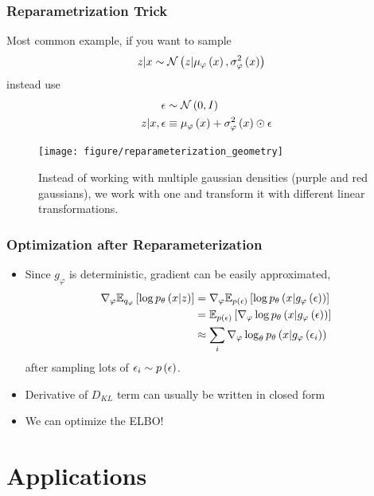 \documentclass[10pt,mathserif]{beamer}
\begin{document}
\begin{frame}
  \frametitle{Reparametrization Trick}
  Most common example, if you want to sample
  \begin{align*}
    z \vert x &\sim \mathcal{N}\left(z \vert \mu_{\varphi}\left(x\right), \sigma_{\varphi}^{2}\left(x\right)\right)
  \end{align*}
  instead use
  \begin{align*}
    \epsilon &\sim \mathcal{N}\left(0, I\right) \\
    z \vert x, \epsilon &\equiv \mu_{\varphi}\left(x\right) + \sigma_{\varphi}^{2}\left(x\right) \odot \epsilon
  \end{align*}
\begin{figure}[ht]
  \centering
  \texttt{[image: figure/reparameterization\_geometry]}
  \caption{Instead of working with multiple gaussian densities (purple and red
    gaussians), we work with one and transform it with different linear
    transformations. \label{fig:reparameterization_geometry} }
\end{figure}

\end{frame}

\begin{frame}
  \frametitle{Optimization after Reparameterization}
  \begin{itemize}
  \item Since $g_{\varphi}$ is deterministic, gradient can be easily
    approximated,
  \begin{align*}
    \nabla_{\varphi} \mathbb{E}_{q_{\varphi}}\left[{\log p_{\theta}\left(x \vert z\right)}\right] &=
    \nabla_{\varphi} \mathbb{E}_{p\left(\epsilon\right)}\left[{\log p_{\theta}\left(x \vert g_{\varphi}\left(\epsilon\right)\right)}\right] \\
    &= \mathbb{E}_{p\left(\epsilon\right)}\left[{\nabla_{\varphi} \log p_{\theta}\left(x \vert g_{\varphi}\left(\epsilon\right)\right)}\right] \\
      &\approx \sum_{i} \nabla_{\varphi} \log_{\theta}p_{\theta}\left(x \vert g_{\varphi}\left(\epsilon_{i}\right)\right)
  \end{align*}
  after sampling lots of $\epsilon_{i} \sim p\left(\epsilon\right)$.
  \item Derivative of $D_{KL}$ term can usually be written in closed form
  \item We can optimize the ELBO!
  \end{itemize}
\end{frame}

\section{Applications}
\label{sec:applications}
\end{document}

